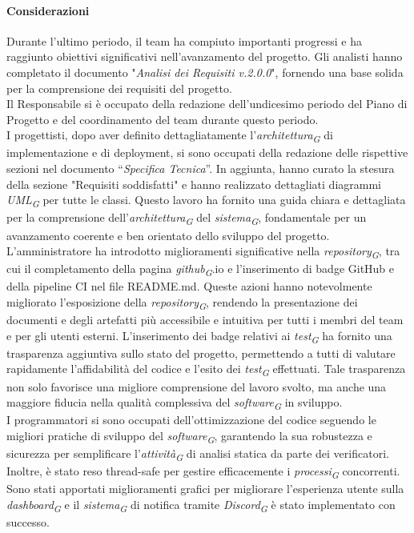 \paragraph{Considerazioni}
Durante l'ultimo periodo, il team ha compiuto importanti progressi e ha raggiunto obiettivi significativi nell'avanzamento del progetto.
Gli analisti hanno completato il documento "\textit{Analisi dei Requisiti v.2.0.0}", fornendo una base solida per la comprensione dei requisiti del progetto. \\
Il Responsabile si è occupato della redazione dell'undicesimo periodo del Piano di Progetto e del coordinamento del team durante questo periodo. \\
I progettisti,  dopo aver definito dettagliatamente l'\textit{architettura}\textsubscript{\textit{G}} di implementazione e di deployment, si sono occupati della redazione delle rispettive sezioni nel documento “\textit{Specifica Tecnica}”. In aggiunta, hanno curato la stesura della sezione "Requisiti soddisfatti" e hanno realizzato dettagliati diagrammi \textit{UML}\textsubscript{\textit{G}} per tutte le classi. Questo lavoro ha fornito una guida chiara e dettagliata per la comprensione dell'\textit{architettura}\textsubscript{\textit{G}} del \textit{sistema}\textsubscript{\textit{G}}, fondamentale per un avanzamento coerente e ben orientato dello sviluppo del progetto. \\
L'amministratore ha introdotto miglioramenti significative nella \textit{repository}\textsubscript{\textit{G}}, tra cui il completamento della pagina \textit{github}\textsubscript{\textit{G}}.io e l'inserimento di badge GitHub e della pipeline CI nel file README.md. 
Queste azioni hanno notevolmente migliorato l'esposizione della \textit{repository}\textsubscript{\textit{G}}, rendendo la presentazione dei documenti e degli artefatti più accessibile e intuitiva per tutti i membri del team e per gli utenti esterni. L'inserimento dei badge relativi ai \textit{test}\textsubscript{\textit{G}} ha fornito una trasparenza aggiuntiva sullo stato del progetto, permettendo a tutti di valutare rapidamente l'affidabilità del codice e l'esito dei \textit{test}\textsubscript{\textit{G}} effettuati. Tale trasparenza non solo favorisce una migliore comprensione del lavoro svolto, ma anche una maggiore fiducia nella qualità complessiva del \textit{software}\textsubscript{\textit{G}} in sviluppo. \\
I programmatori si sono occupati dell’ottimizzazione del codice seguendo le migliori pratiche di sviluppo del \textit{software}\textsubscript{\textit{G}}, garantendo la sua robustezza e sicurezza per semplificare l'\textit{attività}\textsubscript{\textit{G}} di analisi statica da parte dei verificatori. Inoltre, è stato reso thread-safe per gestire efficacemente i \textit{processi}\textsubscript{\textit{G}} concorrenti. Sono stati apportati miglioramenti grafici per migliorare l'esperienza utente sulla \textit{dashboard}\textsubscript{\textit{G}} e il \textit{sistema}\textsubscript{\textit{G}} di notifica tramite \textit{Discord}\textsubscript{\textit{G}} è stato implementato con successo. \\
